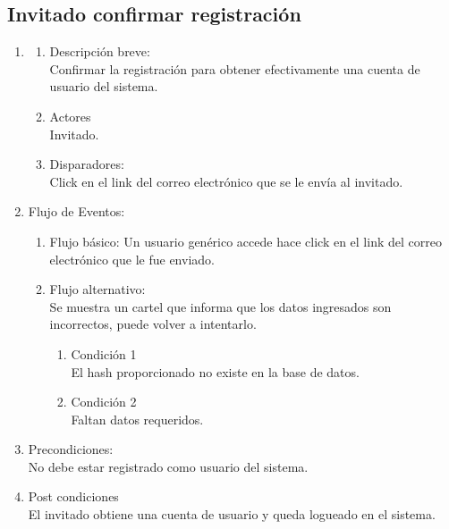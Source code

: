 \documentclass[a4paper,11pt]{article}
\begin{document}
\subsection{Invitado confirmar registración}
\begin{enumerate}

    \item
        \begin{enumerate}
            \item Descripción breve: \\
                Confirmar la registración para obtener efectivamente una cuenta de usuario del sistema.
            \item Actores \\
                Invitado.
            \item Disparadores: \\
                Click en el link del correo electrónico que se le envía al invitado.

        \end{enumerate}

    \item Flujo de Eventos:

        \begin{enumerate}
            \item Flujo básico:
                Un usuario genérico accede hace click en el link del correo electrónico que le fue enviado.

            \item Flujo alternativo:\\
                Se muestra un cartel que informa que los datos ingresados son
                incorrectos, puede volver a intentarlo.

                \begin{enumerate}
                    \item Condición 1 \\
                            El hash proporcionado no existe en la base de datos.
                    \item Condición 2 \\
                            Faltan datos requeridos.
                \end{enumerate}
    \end{enumerate}

    \item Precondiciones: \\
        No debe estar registrado como usuario del sistema.

    \item Post condiciones \\
        El invitado obtiene una cuenta de usuario y queda logueado en el sistema.

\end{enumerate}
\end{document}
